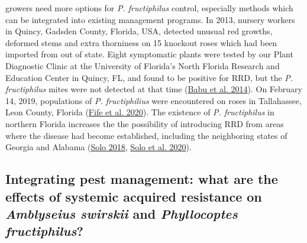 \documentclass{ufdissertation}[overrideChapters] %
\begin{document}
{growers need more options for \emph{P. fructiphilus} control, especially methods which can be integrated into existing management programs. In 2013, nursery workers in Quincy, Gadsden County, Florida, USA, detected unusual red growths, deformed stems and extra thorniness on 15 knockout roses which had been imported from out of state. Eight symptomatic plants were tested by our Plant Diagnostic Clinic at the University of Florida's North Florida Research and Education Center in Quincy, FL, and found to be positive for RRD, but the \emph{P. fructiphilus} mites were not detected at that time (\protect\hyperlink{ref-Babu2014}{Babu et al. 2014}). On February 14, 2019, populations of \emph{P. fructiphilius} were encountered on roses in Tallahassee, Leon County, Florida (\protect\hyperlink{ref-Fife2020}{Fife et al. 2020}). The existence of \emph{P. fructiphilus} in northern Florida increases the the possibility of introducing RRD from areas where the disease had become established, including the neighboring states of Georgia and Alabama (\protect\hyperlink{ref-Solo2018}{Solo 2018}, \protect\hyperlink{ref-Solo2020}{Solo et al. 2020}).

\hypertarget{integrating-pest-management-what-are-the-effects-of-systemic-acquired-resistance-on-amblyseius-swirskii-and-phyllocoptes-fructiphilus}{%
\subsection{\texorpdfstring{Integrating pest management: what are the effects of systemic acquired resistance on \emph{Amblyseius swirskii} and \emph{Phyllocoptes fructiphilus}?}{Integrating pest management: what are the effects of systemic acquired resistance on Amblyseius swirskii and Phyllocoptes fructiphilus?}}\label{integrating-pest-management-what-are-the-effects-of-systemic-acquired-resistance-on-amblyseius-swirskii-and-phyllocoptes-fructiphilus}}

}
\end{document}
